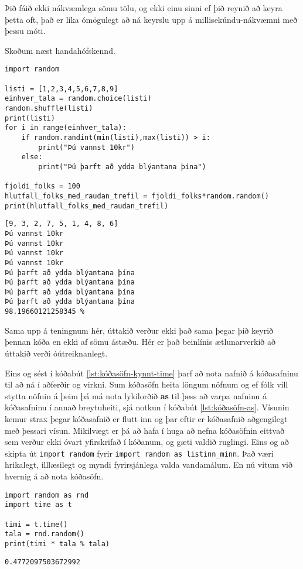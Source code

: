 Þið fáið ekki nákvæmlega sömu tölu, og ekki einu sinni ef þið reynið að keyra þetta oft, það er líka ómögulegt að ná keyrslu upp á millisekúndu-nákvæmni með þessu móti.

Skoðum næst handahófskennd.

\begin{lstlisting}[caption=Notkun kóðasafna með random, label=lst:kóðasöfn-kynnt-rand]
import random

listi = [1,2,3,4,5,6,7,8,9]
einhver_tala = random.choice(listi)
random.shuffle(listi)
print(listi)
for i in range(einhver_tala):
	if random.randint(min(listi),max(listi)) > i:
		print("Þú vannst 10kr")
	else:
		print("Þú þarft að ydda blýantana þína")

fjoldi_folks = 100
hlutfall_folks_med_raudan_trefil = fjoldi_folks*random.random()
print(hlutfall_folks_med_raudan_trefil)
\end{lstlisting}
\lstset{style=uttak}
\begin{lstlisting}
[9, 3, 2, 7, 5, 1, 4, 8, 6]
Þú vannst 10kr
Þú vannst 10kr
Þú vannst 10kr
Þú vannst 10kr
Þú þarft að ydda blýantana þína
Þú þarft að ydda blýantana þína
Þú þarft að ydda blýantana þína
Þú þarft að ydda blýantana þína
98.19660121258345 %
\end{lstlisting}
\lstset{style=venjulegt}

Sama upp á teningnum hér, úttakið verður ekki það sama þegar þið keyrið þennan kóða en ekki af sömu ástæðu.
Hér er það beinlínis ætlunarverkið að úttakið verði óútreiknanlegt.



Eins og sést í kóðabút \ref{lst:kóðasöfn-kynnt-time} þarf að nota nafnið á kóðasafninu til að ná í aðferðir og virkni.
Sum kóðasöfn heita löngum nöfnum og ef fólk vill stytta nöfnin á þeim þá má nota lykilorðið \textbf{as} til þess að varpa nafninu á kóðasafninu í annað breytuheiti, sjá notkun í kóðabút \ref{lst:kóðasöfn-as}.
Vísunin kemur strax þegar kóðasafnið er flutt inn og þar eftir er kóðasafnið aðgengilegt með þessari vísun.
Mikilvægt er þá að hafa í huga að nefna kóðasöfnin eittvað sem verður ekki óvart yfirskrifað í kóðanum, og gæti valdið ruglingi.
Eins og að skipta út \texttt{import random} fyrir \texttt{import random as listinn\_minn}.
Það væri hrikalegt, illlæsilegt og myndi fyrirsjánlega valda vandamálum.
En nú vitum við hvernig á að nota kóðasöfn.

\begin{lstlisting}[caption=Lykilorði as, label=lst:kóðasöfn-as]
import random as rnd
import time as t

timi = t.time() 
tala = rnd.random()
print(timi * tala % tala)
\end{lstlisting}
\lstset{style=uttak}
\begin{lstlisting}
0.4772097503672992
\end{lstlisting}
\lstset{style=venjulegt}

